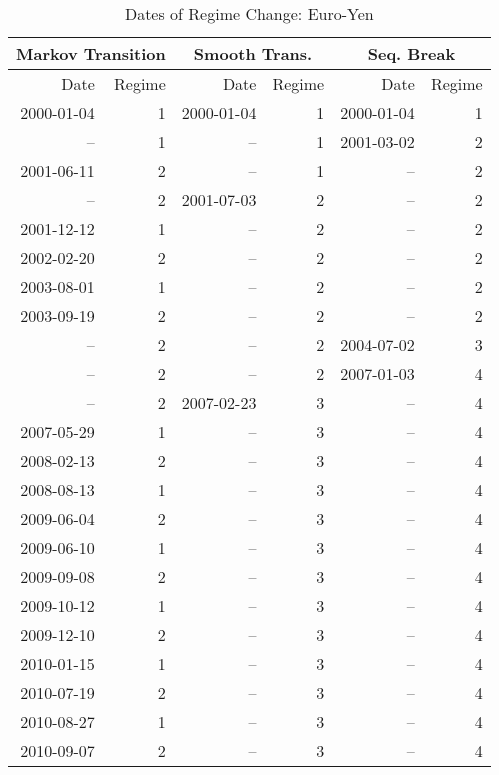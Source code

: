 \documentclass[12pt]{article}
\begin{document}
\begin{table}
	\centering
	\caption{Dates of Regime Change: Euro-Yen}
	\begin{tabular}[c]{r r | r r | r r}
		\midrule
		\multicolumn{2}{c}{Markov Transition} & \multicolumn{2}{c}{Smooth Trans.} & \multicolumn{2}{c}{Seq. Break} \\
		\midrule
		Date & Regime & Date & Regime & Date & Regime \\
		\midrule
		2000-01-04 &  1 & 2000-01-04 &  1 & 2000-01-04 &  1 \\
		        -- &  1 &         -- &  1 & 2001-03-02 &  2 \\
		2001-06-11 &  2 &         -- &  1 &         -- &  2 \\
		        -- &  2 & 2001-07-03 &  2 &         -- &  2 \\
		2001-12-12 &  1 &         -- &  2 &         -- &  2 \\
		2002-02-20 &  2 &         -- &  2 &         -- &  2 \\
		2003-08-01 &  1 &         -- &  2 &         -- &  2 \\
		2003-09-19 &  2 &         -- &  2 &         -- &  2 \\
		        -- &  2 &         -- &  2 & 2004-07-02 &  3 \\
				-- &  2 &         -- &  2 & 2007-01-03 &  4 \\
				-- &  2 & 2007-02-23 &  3 &         -- &  4 \\
		2007-05-29 &  1 &         -- &  3 &         -- &  4 \\
		2008-02-13 &  2 &         -- &  3 &         -- &  4 \\
		2008-08-13 &  1 &         -- &  3 &         -- &  4 \\
		2009-06-04 &  2 &         -- &  3 &         -- &  4 \\
		2009-06-10 &  1 &         -- &  3 &         -- &  4 \\
		2009-09-08 &  2 &         -- &  3 &         -- &  4 \\
		2009-10-12 &  1 &         -- &  3 &         -- &  4 \\
		2009-12-10 &  2 &         -- &  3 &         -- &  4 \\
		2010-01-15 &  1 &         -- &  3 &         -- &  4 \\
		2010-07-19 &  2 &         -- &  3 &         -- &  4 \\
		2010-08-27 &  1 &         -- &  3 &         -- &  4 \\
		2010-09-07 &  2 &         -- &  3 &         -- &  4 \\

\end{tabular}
\end{table}
\end{document}
